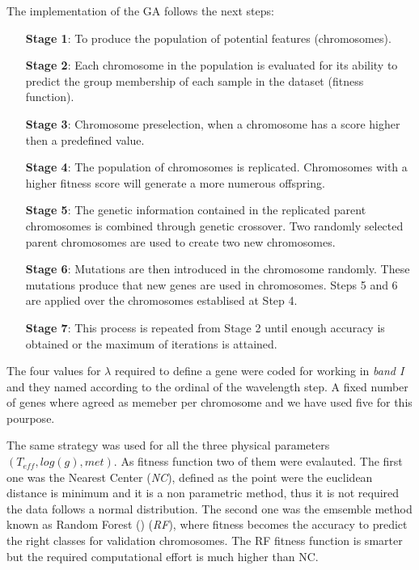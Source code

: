 {
The implementation of the GA follows the next steps:
\begin{itemize}
 \item [\textbf{Stage 1}:]{To produce the population of potential features (chromosomes).}
 \item [\textbf{Stage 2}:]{Each chromosome in the population is evaluated for its ability to
predict the group membership of each sample in the dataset (fitness function).}
 \item [\textbf{Stage 3}:]{Chromosome preselection, when a chromosome has 
 a score higher then a predefined value.}
 \item [\textbf{Stage 4}:]{The population of chromosomes is replicated. 
 Chromosomes with a higher fitness score will 
 generate a more numerous offspring.}
 \item [\textbf{Stage 5}:]{The genetic information contained in the replicated parent
chromosomes is combined through genetic crossover. Two randomly selected
parent chromosomes are used to create two new chromosomes.}
 \item [\textbf{Stage 6}:]{Mutations are then introduced in the chromosome randomly. 
 These mutations produce that new genes are used in chromosomes.
 Steps 5 and 6 are applied over the chromosomes establised at Step 4.}
  \item [\textbf{Stage 7}:]{This process is repeated from Stage 2 until 
  enough accuracy is obtained or the maximum of iterations is attained.}
\end{itemize}

The four values for $\lambda$ required to define a 
gene were coded for working in \emph{band I} and 
they named according to the ordinal of the wavelength step.
A fixed number of genes where agreed as memeber per chromosome 
and we have used five for this pourpose.
}

{
The same strategy was used for all the three physical parameters $(T_{eff}, log(g), met)$.
As fitness function two of them were evalauted. The first one was the Nearest Center (\emph{NC}), 
defined as the point were the euclidean distance is minimum and it is a non
parametric method, thus it is not required the data follows a normal distribution.
The second one was the emsemble method known as Random Forest (\cite{breiman2001random}) (\emph{RF}), 
where fitness becomes the accuracy to predict the right classes for 
validation chromosomes. The RF fitness function is smarter but
the required computational effort is much higher than NC.
}

